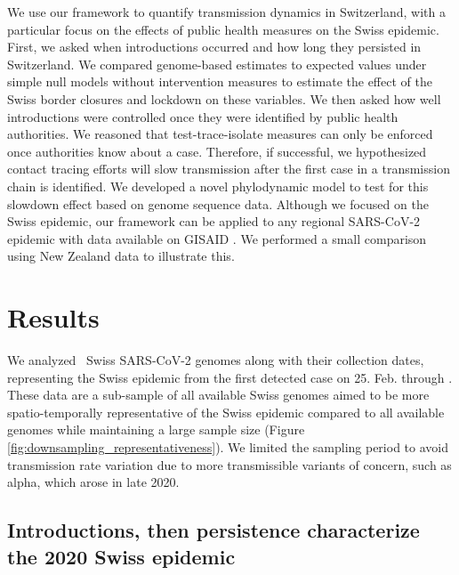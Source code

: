 \documentclass[11pt,twoside,lineno]{pnas-new} %
\begin{document}
We use our framework to quantify transmission dynamics in Switzerland, with a particular focus on the effects of public health measures on the Swiss epidemic. First, we asked when introductions occurred and how long they persisted in Switzerland. We compared genome-based estimates to expected values under simple null models without intervention measures to estimate the effect of the Swiss border closures and lockdown on these variables. We then asked how well introductions were controlled once they were identified by public health authorities. We reasoned that test-trace-isolate measures can only be enforced once authorities know about a case. Therefore, if successful, we hypothesized contact tracing efforts will slow transmission after the first case in a transmission chain is identified. We developed a novel phylodynamic model to test for this slowdown effect based on genome sequence data. Although we focused on the Swiss epidemic, our framework can be applied to any regional SARS-CoV-2 epidemic with data available on GISAID \cite{GISAID}. We performed a small comparison using New Zealand data to illustrate this. 

\section{Results}
We analyzed \nfocalsamples\ Swiss SARS-CoV-2 genomes along with their collection dates, representing the Swiss epidemic from the first detected case on 25. Feb. through \maxdate. These data are a sub-sample of all available Swiss genomes aimed to be more spatio-temporally representative of the Swiss epidemic compared to all available genomes while maintaining a large sample size (Figure  \ref{fig:downsampling_representativeness}). We limited the sampling period to avoid transmission rate variation due to more transmissible variants of concern, such as alpha, which arose in late 2020.

\subsection{Introductions, then persistence characterize the 2020 Swiss epidemic}
\end{document}

